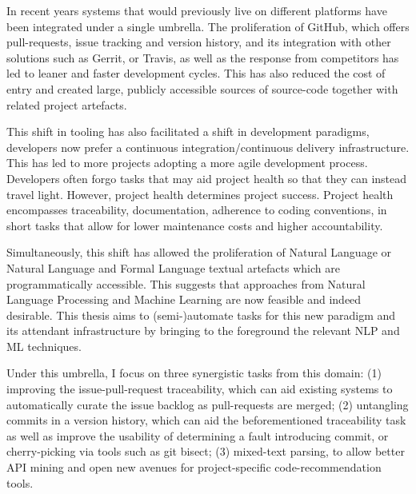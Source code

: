 In recent years systems that would previously live on different platforms
have been integrated under a single umbrella. The proliferation of GitHub,
which offers pull-requests, issue tracking and version history, and its
integration with other solutions such as Gerrit, or Travis, as well as the
response from competitors has led to leaner and faster development cycles.
This has also reduced the cost of entry and created large, publicly
accessible sources of source-code together with related project artefacts.

This shift in tooling has also facilitated a shift in development paradigms,
developers now prefer a continuous integration/continuous delivery
infrastructure. This has led to more projects adopting a more agile
development process. Developers often forgo tasks that may aid project
health so that they can instead travel light. However, project health
determines project success.  Project health encompasses traceability,
documentation, adherence to coding conventions, in short tasks that allow
for lower maintenance costs and higher accountability.

Simultaneously, this shift has allowed the proliferation of Natural
Language or Natural Language and Formal Language textual artefacts which are
programmatically accessible. This suggests that approaches from Natural
Language Processing and Machine Learning are now feasible and indeed
desirable. This thesis aims to (semi-)automate tasks for this new paradigm
and its attendant infrastructure by bringing to the foreground the relevant
NLP and ML techniques.

Under this umbrella, I focus on three synergistic tasks from this domain: (1)
improving the issue-pull-request traceability, which can aid existing systems to
automatically curate the issue backlog as pull-requests are merged; (2)
untangling commits in a version history, which can aid the beforementioned
traceability task as well as improve the usability of determining a fault
introducing commit, or cherry-picking via tools such as git bisect; (3)
mixed-text parsing, to allow better API mining and open new avenues for
project-specific code-recommendation tools.